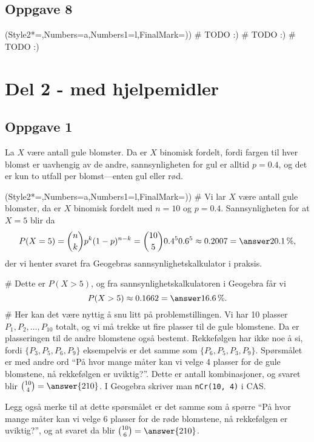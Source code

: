 \subsection*{Oppgave 8}
\begin{easylist}[enumerate]
	\ListProperties(Style2*=,Numbers=a,Numbers1=l,FinalMark={)})
	# TODO :)
	# TODO :)
	# TODO :)
\end{easylist}



\clearpage 
\section*{Del 2 - med hjelpemidler}

\subsection*{Oppgave 1}
La $X$ være antall gule blomster.
Da er $X$ binomisk fordelt, fordi fargen til hver blomst er uavhengig av de andre, sannsynligheten for gul er alltid $p = 0.4$, og det er kun to utfall per blomst---enten gul eller rød.

\begin{easylist}[enumerate]
	\ListProperties(Style2*=,Numbers=a,Numbers1=l,FinalMark={)})
	# Vi lar $X$ være antall gule blomster, da er $X$ binomisk fordelt med $n=10$ og $p=0.4$. 
	Sannsynligheten for at $X=5$ blir da
	\begin{equation*}
		P(X = 5) = \binom{n}{k} p^k (1-p)^{n-k} = 
		\binom{10}{5} 0.4^5 0.6^{5} \approx 0.2007 = \answer{20.1 \, \%},
	\end{equation*}
	der vi henter svaret fra Geogebras sannsynlighetskalkulator i praksis.
	
	
	# Dette er $P(X > 5)$, og fra sannsynlighetskalkulatoren i Geogebra får vi
	\begin{equation*}
		P(X > 5) \approx 0.1662 = \answer{16.6 \, \%} .
	\end{equation*}
	# Her kan det være nyttig å snu litt på problemstillingen.
	Vi har 10 plasser $P_1, P_2, \dots, P_{10}$ totalt, og vi må trekke ut fire plasser til de gule blomstene.
	Da er plasseringen til de andre blomstene også bestemt.
	Rekkefølgen har ikke noe å si, fordi $\{ P_3, P_5, P_6, P_9 \}$ eksempelvis er det samme som $\{ P_6, P_5, P_3, P_9 \}$.
	Spørsmålet er med andre ord ``På hvor mange måter kan vi velge 4 plasser for de gule blomstene, nå rekkefølgen er uviktig?''.
	Dette er antall kombinasjoner, og svaret blir $\binom{10}{4} = \answer{210}$.
	I Geogebra skriver man \verb|nCr(10, 4)| i CAS.
	
	Legg også merke til at dette spørsmålet er det samme som å spørre ``På hvor mange måter kan vi velge 6 plasser for de røde blomstene, nå rekkefølgen er uviktig?'', og at svaret da blir $\binom{10}{6} = \answer{210}$.
\end{easylist}

